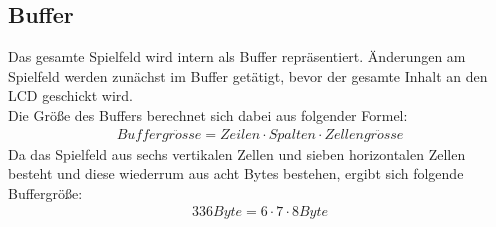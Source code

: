    \subsection{Buffer}
        Das gesamte Spielfeld wird intern als Buffer repräsentiert.
        Änderungen am Spielfeld werden zunächst im Buffer getätigt, bevor der gesamte Inhalt an den LCD geschickt wird.
        \\
        Die Größe des Buffers berechnet sich dabei aus folgender Formel:
        \begin{align}
        Buffergr\ddot{o}sse = Zeilen \cdot Spalten \cdot Zellengr\ddot{o}sse
        \end{align}
        Da das Spielfeld aus sechs vertikalen Zellen und sieben horizontalen Zellen besteht und diese wiederrum aus acht Bytes bestehen,
        ergibt sich folgende Buffergröße:
        \begin{align}
        336 Byte = 6  \cdot 7  \cdot 8 Byte
        \end{align}

  





        
